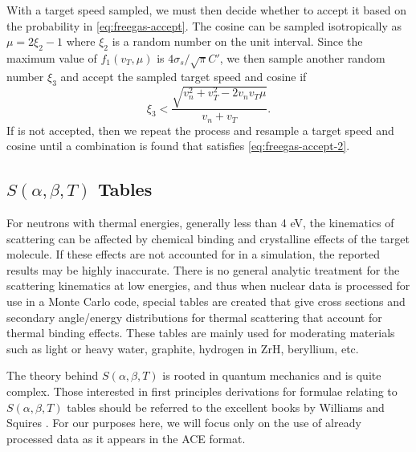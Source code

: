 With a target speed sampled, we must then decide whether to accept it based on
the probability in \eqref{eq:freegas-accept}. The cosine can be sampled
isotropically as $\mu = 2\xi_2 - 1$ where $\xi_2$ is a random number on the unit
interval. Since the maximum value of $f_1(v_T, \mu)$ is $4\sigma_s / \sqrt{\pi}
C'$, we then sample another random number $\xi_3$ and accept the sampled target
speed and cosine if
\begin{equation}
  \label{eq:freegas-accept-2}
  \xi_3 < \frac{\sqrt{v_n^2 + v_T^2 - 2 v_n v_T \mu}}{v_n + v_T}.
\end{equation}
If is not accepted, then we repeat the process and resample a target speed and
cosine until a combination is found that satisfies \eqref{eq:freegas-accept-2}.

\subsection{\texorpdfstring{$S(\alpha,\beta,T)$}{S(a,b,T)} Tables}

For neutrons with thermal energies, generally less than 4 eV, the kinematics of
scattering can be affected by chemical binding and crystalline effects of the
target molecule. If these effects are not accounted for in a simulation, the
reported results may be highly inaccurate. There is no general analytic
treatment for the scattering kinematics at low energies, and thus when nuclear
data is processed for use in a Monte Carlo code, special tables are created that
give cross sections and secondary angle/energy distributions for thermal
scattering that account for thermal binding effects. These tables are mainly
used for moderating materials such as light or heavy water, graphite, hydrogen
in ZrH, beryllium, etc.

The theory behind $S(\alpha,\beta,T)$ is rooted in quantum mechanics and is
quite complex. Those interested in first principles derivations for formulae
relating to $S(\alpha,\beta,T)$ tables should be referred to the excellent books
by Williams \cite{Williams-1966} and Squires \cite{squires-1978}. For our
purposes here, we will focus only on the use of already processed data as it
appears in the ACE format.


